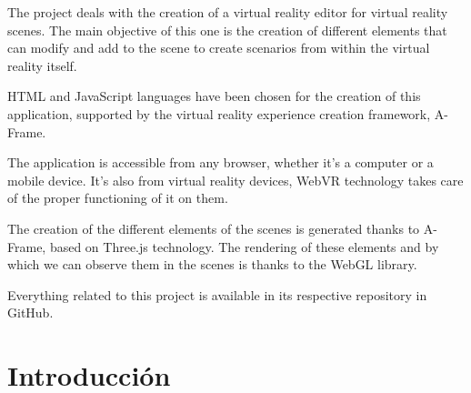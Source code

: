 \documentclass[a4paper, 12pt]{book}
\begin{document}
The project deals with the creation of a virtual reality editor for virtual reality scenes. The main objective of this one is the creation of different elements that can modify and add to the scene to create scenarios from within the virtual reality itself.

HTML and JavaScript languages have been chosen for the creation of this application, supported by the virtual reality experience creation framework, A-Frame.

The application is accessible from any browser, whether it's a computer or a mobile device. It's also from virtual reality devices, WebVR technology takes care of the proper functioning of it on them.

The creation of the different elements of the scenes is generated thanks to A-Frame, based on Three.js technology. The rendering of these elements and by which we can observe them in the scenes is thanks to the WebGL library.

Everything related to this project is available in its respective repository in GitHub.



\tableofcontents 
\cleardoublepage
\listoffigures %




\cleardoublepage
\chapter{Introducción}
\label{sec:intro} %
\end{document}
